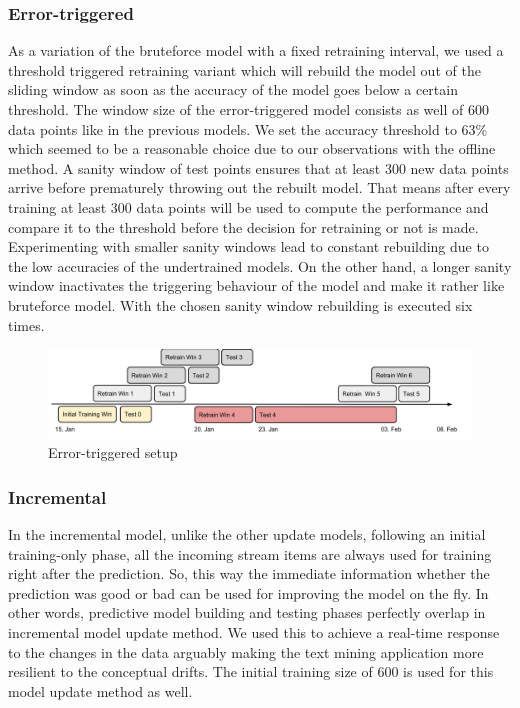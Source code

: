 \documentclass{article} %
\begin{document}
\subsubsection*{Error-triggered}
As a variation of the bruteforce model with a fixed retraining interval, we used a threshold triggered retraining variant which will rebuild the model out of the sliding window as soon as the accuracy of the model goes below a certain threshold. The window size of the error-triggered model consists as well of 600 data points like in the previous models. We set the accuracy threshold to 63\% which seemed to be a reasonable choice due to our observations with the offline method. A sanity window of test points ensures that at least 300 new data points arrive before prematurely throwing out the rebuilt model. That means after every training at least 300 data points will be used to compute the performance and compare it to the threshold before the decision for retraining or not is made. Experimenting with smaller sanity windows lead to constant rebuilding due to the low accuracies of the undertrained models.  On the other hand, a longer sanity window inactivates the triggering behaviour of the model and make it rather like bruteforce model. With the chosen sanity window rebuilding is executed six times.

\begin{figure}[htbp]
  \centering
  \includegraphics[scale=0.25]{./time_models/Errortriggered.png}
  \caption{Error-triggered setup}
\end{figure}
\subsubsection*{Incremental}
In the incremental model, unlike the other update models, following an initial training-only phase, all the incoming stream items are always used for training right after the prediction. So, this way the immediate information whether the prediction was good or bad can be used for improving the model on the fly. In other words, predictive model building and testing phases perfectly overlap in incremental model update method. We used this to achieve a real-time response to the changes in the data arguably making the text mining application more resilient to the conceptual drifts. The initial training size of 600 is used for this model update method as well.
\end{document}
